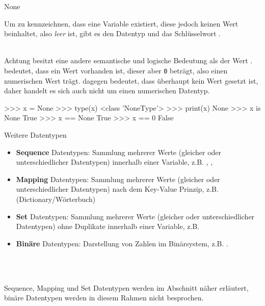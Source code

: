         \begin{frame}[fragile]{None}
            
            Um zu kennzeichnen, dass eine Variable existiert, diese jedoch keinen Wert beinhaltet, also \textit{leer} ist, gibt es den Datentyp und das Schlüsselwort .\\~\
            
            \begin{alertblock}{Achtung}
                 besitzt eine andere semantische und logische Bedeutung als der Wert .  bedeutet, dass ein Wert vorhanden ist, dieser aber \texttt{0} beträgt, also einen numerischen Wert trägt.  dagegen bedeutet, dass überhaupt kein Wert gesetzt ist, daher handelt es sich auch nicht um einen numerischen Datentyp.
            \end{alertblock}

\begin{pyconcode}
>>> x = None
>>> type(x)
<class 'NoneType'>
>>> print(x)
None
>>> x is None
True
>>> x == None
True
>>> x == 0
False
\end{pyconcode}            
            
         \end{frame}
        
         \begin{frame}[fragile]{Weitere Datentypen}
            
            \begin{itemize}
                \item \textbf{Sequence} Datentypen: Sammlung mehrerer Werte (gleicher oder unterschiedlicher Datentypen) innerhalb einer Variable, z.B. , , 
                
                \item \textbf{Mapping} Datentypen: Sammlung mehrerer Werte (gleicher oder unterschiedlicher Datentypen) nach dem Key-Value Prinzip, z.B.  (Dictionary/Wörterbuch)
                
                \item \textbf{Set} Datentypen: Sammlung mehrerer Werte (gleicher oder unterschiedlicher Datentypen) ohne Duplikate innerhalb einer Variable, z.B. 
                
                \item \textbf{Binäre} Datentypen: Darstellung von Zahlen im Binärsystem, z.B. .
            \end{itemize}\\~\
            
            Sequence, Mapping und Set Datentypen werden im Abschnitt  näher erläutert, binäre Datentypen werden in diesem Rahmen nicht besprochen.
         \end{frame}
         
